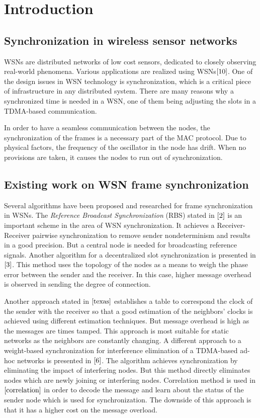 \documentclass[journal]{IEEEtran}
\begin{document}
\section{\textbf{Introduction}}
\subsection{\textbf{Synchronization in wireless sensor networks}}
 WSNs are distributed networks of low cost sensors, dedicated to closely observing real-world phenomena.
 Various applications are realized using WSNs$\cite{10}$. One of
 the design issues in WSN technology is synchronization, which is a
  critical piece of infrastructure in any distributed system. There
  are many reasons why a synchronized time is needed in a WSN, one of
  them being adjusting the slots in a TDMA-based communication. \par
In order to have a seamless communication between the nodes, the
synchronization of the frames is a necessary part of the MAC
protocol. Due to physical factors, the frequency of the oscillator
 in the node has drift. When no provisions are taken, it causes the nodes to run out of synchronization.
\subsection{\textbf{Existing work on WSN frame synchronization}}
 Several algorithms have been proposed and researched for
frame synchronization in WSNs. The \textit{Reference Broadcast
Synchronization} (RBS) stated in $\cite{2}$ is an important scheme
in the area of WSN synchronization. It achieves a Receiver-Receiver
pairwise synchronization to remove sender nondeterminism and results
in a good precision. But a central node is needed for broadcasting reference signals. Another algorithm for a decentralized slot
synchronization is presented in $\cite{3}$. This method uses the
topology of the nodes as a means to weigh the phase error between
the sender and the receiver. In this case, higher message overhead is observed in sending the degree of connection.
\par
Another approach stated in $\cite{texas}$ establishes a table to
correspond the clock of the sender with the receiver so that a good
estimation of the neighbors' clocks is achieved using different
estimation techniques. But message overhead is high as the messages
are times tamped. This approach is most suitable for static networks
as the neighbors are constantly changing. A different approach to a
weight-based synchronization for interference elimination of a
TDMA-based ad-hoc networks is presented in $\cite{6}$. The algorithm
achieves synchronization by eliminating the impact of interfering
nodes. But this method directly eliminates nodes which are newly
joining or interfering nodes. Correlation method is used in
$\cite{correlation}$ in order to decode the message and learn about
the status of the sender node which is used for synchronization. The
downside of this approach is that it has a higher cost on the
message overload.
\end{document}
